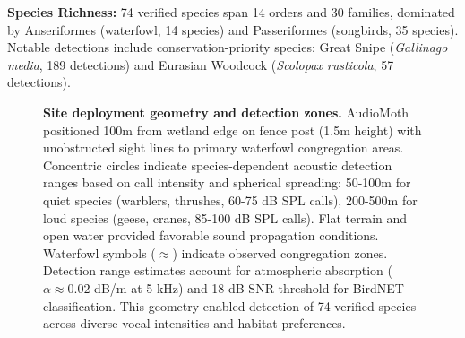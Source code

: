 \documentclass[twocolumn]{article}
\begin{document}
\textbf{Species Richness:} 74 verified species span 14 orders and 30 families, dominated by Anseriformes (waterfowl, 14 species) and Passeriformes (songbirds, 35 species). Notable detections include conservation-priority species: Great Snipe (\textit{Gallinago media}, 189 detections) and Eurasian Woodcock (\textit{Scolopax rusticola}, 57 detections).

\begin{figure}[H]
\centering
{}
\caption{\textbf{Site deployment geometry and detection zones.} AudioMoth positioned 100m from wetland edge on fence post (1.5m height) with unobstructed sight lines to primary waterfowl congregation areas. Concentric circles indicate species-dependent acoustic detection ranges based on call intensity and spherical spreading: 50-100m for quiet species (warblers, thrushes, 60-75 dB SPL calls), 200-500m for loud species (geese, cranes, 85-100 dB SPL calls). Flat terrain and open water provided favorable sound propagation conditions. Waterfowl symbols ($\approx$) indicate observed congregation zones. Detection range estimates account for atmospheric absorption ($\alpha \approx 0.02$ dB/m at 5 kHz) and 18 dB SNR threshold for BirdNET classification. This geometry enabled detection of 74 verified species across diverse vocal intensities and habitat preferences.}
\label{fig:site_map}
\end{figure}
\end{document}

